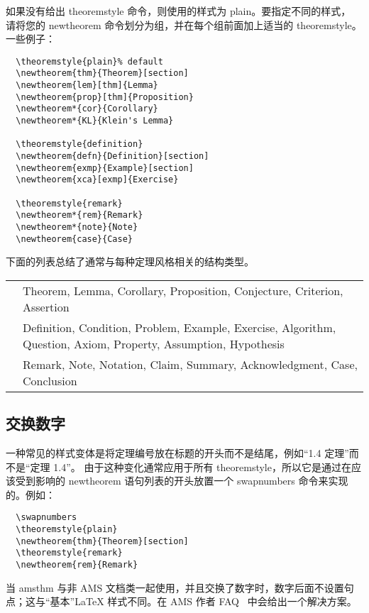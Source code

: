 \documentclass{article}
\providecommand{\qq}[1]{“#1”}
\newcommand{\ntt}{%
  \fontfamily\ttdefault \fontseries\mddefault \fontshape\updefault
  \selectfont
}
\DeclareRobustCommand{\cn}[1]{{\ntt\bslchar#1}}
\DeclareRobustCommand{\pkg}[1]{\textsf{#1}}
\DeclareRobustCommand{\env}[1]{{\ntt#1}}
\def\latex/{{\protect\LaTeX}}
\begin{document}
如果没有给出 \cn{theoremstyle} 命令，则使用的样式为 \env{plain}。要指定不同的样式，
请将您的 \cn{newtheorem} 命令划分为组，并在每个组前面加上适当的 \cn{theoremstyle}。一些例子：\label{thmstyle:list}
\begin{verbatim}
  \theoremstyle{plain}% default
  \newtheorem{thm}{Theorem}[section]
  \newtheorem{lem}[thm]{Lemma}
  \newtheorem{prop}[thm]{Proposition}
  \newtheorem*{cor}{Corollary}
  \newtheorem*{KL}{Klein's Lemma}

  \theoremstyle{definition}
  \newtheorem{defn}{Definition}[section]
  \newtheorem{exmp}{Example}[section]
  \newtheorem{xca}[exmp]{Exercise}

  \theoremstyle{remark}
  \newtheorem*{rem}{Remark}
  \newtheorem*{note}{Note}
  \newtheorem{case}{Case}
\end{verbatim}

下面的列表总结了通常与每种定理风格相关的结构类型。

\begin{center}
\begin{tabular}{l@{\quad}p{9cm}}
 \relax\env{plain} & Theorem, Lemma, Corollary, Proposition, Conjecture, Criterion, Assertion\\
 \relax\env{definition} & Definition, Condition, Problem, Example, Exercise, Algorithm, Question, Axiom, Property, Assumption, Hypothesis\\
 \relax\env{remark} & Remark, Note, Notation, Claim, Summary, Acknowledgment, Case, Conclusion
\end{tabular}
\end{center}

\subsection{交换数字}

一种常见的样式变体是将定理编号放在标题的开头而不是结尾，例如\qq{1.4 定理}而不是\qq{定理 1.4}。
由于这种变化通常应用于所有 \cn{theoremstyle}，所以它是通过在应该受到影响的 \cn{newtheorem} 
语句列表的开头放置一个 \cn{swapnumbers} 命令来实现的。例如：
\begin{verbatim}
  \swapnumbers
  \theoremstyle{plain}
  \newtheorem{thm}{Theorem}[section]
  \theoremstyle{remark}
  \newtheorem{rem}{Remark}
\end{verbatim}

当 \pkg{amsthm} 与非 AMS 文档类一起使用，并且交换了数字时，数字后面不设置句点；这与“基本”\latex/ 样式不同。在 AMS 作者 FAQ~\cite{AF} 中会给出一个解决方案。
\end{document}
